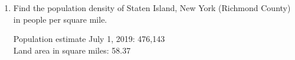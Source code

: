 \begin{enumerate}
\subsubsection*{Modeling with geometry: density \hfill HSG.MG.A.2}
\item Find the population density of Staten Island, New York (Richmond County) in people per square mile.
  \begin{multicols}{2}
  Population estimate July 1, 2019: 476,143\\[0.25cm]
  Land area in square miles: 58.37
  \end{multicols}


\end{enumerate}
